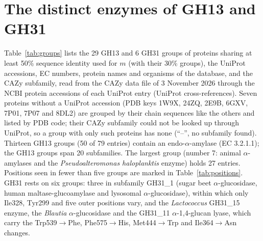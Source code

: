 \documentclass[preprint,12pt]{elsarticle}
\begin{document}
\section{The distinct enzymes of GH13 and GH31}\label{sec:groups}
Table~\ref{tab:groups} lists the 29 GH13 and 6 GH31 groups of proteins sharing at least 50\% sequence identity used
for $m$ (with their 30\% groups), the UniProt accessions, EC numbers, protein names and organisms of the database,
and the CAZy subfamily, read from the CAZy data file of 3 November 2026 through the NCBI protein accessions of each
UniProt entry (UniProt cross-references). Seven proteins without a UniProt accession (PDB keys 1W9X, 24ZQ, 2E9B,
6GXV, 7P01, 7P07 and 8DL2) are grouped by their chain sequences like the others and listed by PDB code; their CAZy
subfamily could not be looked up through UniProt, so a group with only such proteins has none (``--'', no
subfamily found). Thirteen GH13 groups (50 of 79 entries) contain an endo-$\alpha$-amylase (EC 3.2.1.1); the GH13
groups span 20 subfamilies. The largest group (number 7: animal $\alpha$-amylases and the
\emph{Pseudoalteromonas haloplanktis} enzyme) holds 27 entries. Positions seen in fewer than five groups are marked
in Table~\ref{tab:positions}. GH31 rests on six groups: three in subfamily GH31\_1 (sugar beet $\alpha$-glucosidase,
human maltase-glucoamylase and lysosomal $\alpha$-glucosidase), within which only Ile328, Tyr299 and five outer
positions vary, and the \emph{Lactococcus} GH31\_15 enzyme, the \emph{Blautia} $\alpha$-glucosidase and the GH31\_11
$\alpha$-1,4-glucan lyase, which carry the Trp539$\to$Phe, Phe575$\to$His, Met444$\to$Trp and Ile364$\to$Asn changes.
\end{document}
